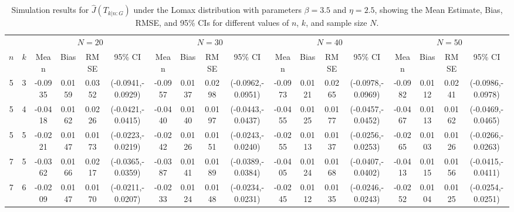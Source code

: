 \documentclass[12pt,a4paper]{article}
\numberwithin{equation}{section}
\begin{document}
\begin{table}
\centering
\caption{Simulation results for $\widehat J(T_{k|n:G})$ under the Lomax distribution with parameters $\beta=3.5$ and $\eta=2.5$, showing the Mean Estimate, Bias, RMSE, and 95\% CIs for different values of $n$, $k$, and sample size $N$.}
\label{tab2}

\renewcommand{\arraystretch}{1.5}
\setlength{\tabcolsep}{3pt}

\scriptsize

\begin{tabular}{cccccccccccccccccc}
\toprule

& &
\multicolumn{4}{c}{$N=20$} &
\multicolumn{4}{c}{$N=30$} &
\multicolumn{4}{c}{$N=40$} &
\multicolumn{4}{c}{$N=50$} \\

\cmidrule(lr){3-6}
\cmidrule(lr){7-10}
\cmidrule(lr){11-14}
\cmidrule(lr){15-18}

$n$ & $k$
& Mean & Bias & RMSE & 95\% CI
& Mean & Bias & RMSE & 95\% CI
& Mean & Bias & RMSE & 95\% CI
& Mean & Bias & RMSE & 95\% CI \\

\midrule

5 & 3
& -0.0935 & 0.0159 & 0.0352 & (-0.0941,-0.0929)
& -0.0957 & 0.0137 & 0.0298 & (-0.0962,-0.0951)
& -0.0973 & 0.0121 & 0.0265 & (-0.0978,-0.0969)
& -0.0982 & 0.0112 & 0.0241 & (-0.0986,-0.0978) \\

5 & 4
& -0.0418 & 0.0162 & 0.0226 & (-0.0421,-0.0415)
& -0.0440 & 0.0140 & 0.0197 & (-0.0443,-0.0437)
& -0.0455 & 0.0125 & 0.0177 & (-0.0457,-0.0452)
& -0.0467 & 0.0113 & 0.0162 & (-0.0469,-0.0465) \\

5 & 5
& -0.0221 & 0.0147 & 0.0173 & (-0.0223,-0.0219)
& -0.0242 & 0.0126 & 0.0151 & (-0.0243,-0.0240)
& -0.0255 & 0.0113 & 0.0137 & (-0.0256,-0.0253)
& -0.0265 & 0.0103 & 0.0126 & (-0.0266,-0.0263) \\

\midrule

7 & 5
& -0.0362 & 0.0166 & 0.0217 & (-0.0365,-0.0359)
& -0.0387 & 0.0141 & 0.0189 & (-0.0389,-0.0384)
& -0.0405 & 0.0124 & 0.0168 & (-0.0407,-0.0402)
& -0.0413 & 0.0115 & 0.0156 & (-0.0415,-0.0411) \\

7 & 6
& -0.0209 & 0.0147 & 0.0170 & (-0.0211,-0.0207)
& -0.0233 & 0.0124 & 0.0148 & (-0.0234,-0.0231)
& -0.0245 & 0.0112 & 0.0135 & (-0.0246,-0.0243)
& -0.0252 & 0.0104 & 0.0125 & (-0.0254,-0.0251) \\


\end{tabular}
\end{table}
\end{document}
